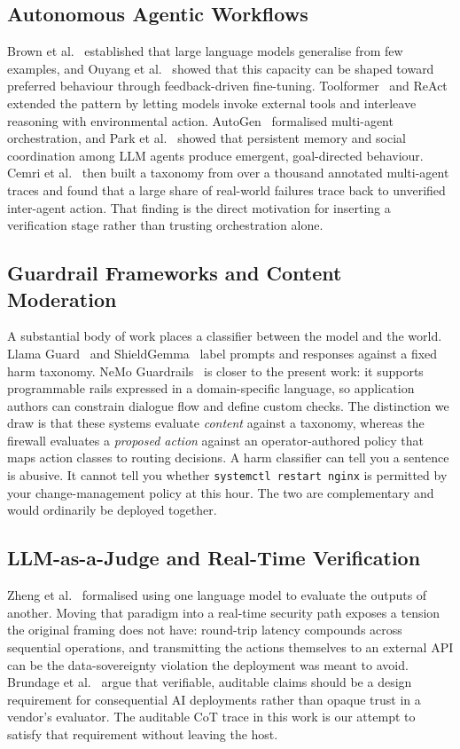 \documentclass[conference]{IEEEtran}
\begin{document}
\subsection{Autonomous Agentic Workflows}
Brown et al.~\cite{brown2020} established that large language models generalise from few examples, and Ouyang et al.~\cite{ouyang2022} showed that this capacity can be shaped toward preferred behaviour through feedback-driven fine-tuning. Toolformer~\cite{schick2023} and ReAct~\cite{yao2023} extended the pattern by letting models invoke external tools and interleave reasoning with environmental action. AutoGen~\cite{wu2023} formalised multi-agent orchestration, and Park et al.~\cite{park2023} showed that persistent memory and social coordination among LLM agents produce emergent, goal-directed behaviour. Cemri et al.~\cite{cemri2025} then built a taxonomy from over a thousand annotated multi-agent traces and found that a large share of real-world failures trace back to unverified inter-agent action. That finding is the direct motivation for inserting a verification stage rather than trusting orchestration alone.

\subsection{Guardrail Frameworks and Content Moderation}
A substantial body of work places a classifier between the model and the world. Llama Guard~\cite{inan2023} and ShieldGemma~\cite{zeng2024} label prompts and responses against a fixed harm taxonomy. NeMo Guardrails~\cite{rebedea2023} is closer to the present work: it supports programmable rails expressed in a domain-specific language, so application authors can constrain dialogue flow and define custom checks. The distinction we draw is that these systems evaluate \emph{content} against a taxonomy, whereas the firewall evaluates a \emph{proposed action} against an operator-authored policy that maps action classes to routing decisions. A harm classifier can tell you a sentence is abusive. It cannot tell you whether \texttt{systemctl restart nginx} is permitted by your change-management policy at this hour. The two are complementary and would ordinarily be deployed together.

\subsection{LLM-as-a-Judge and Real-Time Verification}
Zheng et al.~\cite{zheng2023} formalised using one language model to evaluate the outputs of another. Moving that paradigm into a real-time security path exposes a tension the original framing does not have: round-trip latency compounds across sequential operations, and transmitting the actions themselves to an external API can be the data-sovereignty violation the deployment was meant to avoid. Brundage et al.~\cite{brundage2020} argue that verifiable, auditable claims should be a design requirement for consequential AI deployments rather than opaque trust in a vendor's evaluator. The auditable CoT trace in this work is our attempt to satisfy that requirement without leaving the host.
\end{document}
